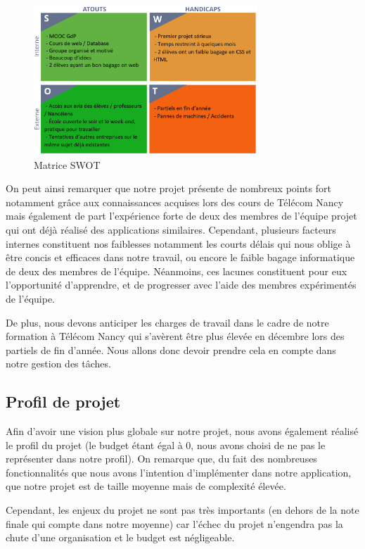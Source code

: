 \documentclass[french,a4paper]{article}
\begin{document}
\begin{figure}[H]
    \centering
    \includegraphics[width=0.75\textwidth]{img/SWOT.png}
    \caption{Matrice SWOT}
\end{figure}

On peut ainsi remarquer que notre projet présente de nombreux points fort notamment grâce aux connaissances acquises lors des cours de Télécom Nancy mais également de part l’expérience forte de deux des membres de l’équipe projet qui ont déjà réalisé des applications similaires.  Cependant, plusieurs facteurs internes constituent nos faiblesses notamment les courts délais qui nous oblige à être concis et efficaces dans notre travail, ou encore le faible bagage informatique de deux des membres de l’équipe. Néanmoins, ces lacunes constituent pour eux l’opportunité d’apprendre, et de progresser avec l’aide des membres expérimentés de l’équipe.

De plus, nous devons anticiper les charges de travail dans le cadre de notre formation à Télécom Nancy qui s'avèrent être plus élevée en décembre lors des partiels de fin d'année. Nous allons donc devoir prendre cela en compte dans notre gestion des tâches.

\subsection{Profil de projet}
Afin d’avoir une vision plus globale sur notre projet, nous avons également réalisé le profil du projet (le budget étant égal à 0, nous avons choisi de ne pas le représenter dans notre profil). On remarque que, du fait des nombreuses fonctionnalités que nous avons l’intention d’implémenter dans notre application, que notre projet est de taille moyenne mais de complexité élevée.

Cependant, les enjeux du projet ne sont pas très importants (en dehors de la note finale qui compte dans notre moyenne) car l'échec du projet n'engendra pas la chute d'une organisation et le budget est négligeable.
\end{document}

